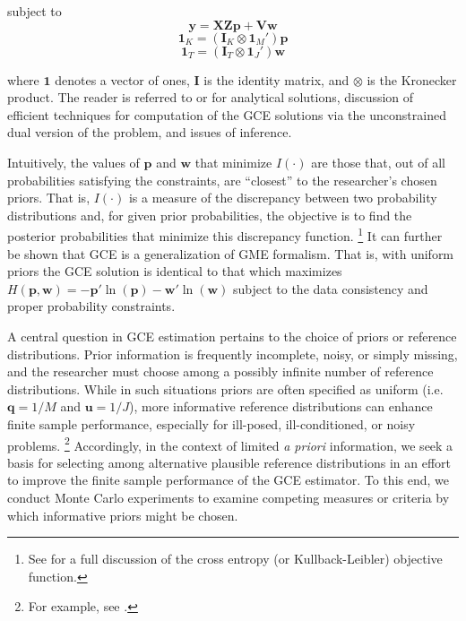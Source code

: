 \documentclass[english]{article}
\begin{document}
\noindent
subject to
\begin{equation}
\mathbf{y} = \mathbf{X Z p} 
+ \mathbf{V w}
\end{equation}
\begin{equation}
\mathbf{1}_K = (\mathbf{I}_K \otimes \mathbf{1}_M')\mathbf{p}
\end{equation}
\begin{equation}
\mathbf{1}_T = (\mathbf{I}_T \otimes \mathbf{1}_J')\mathbf{w}
\end{equation}

\noindent
where $\mathbf{1}$ denotes a vector of ones, $\mathbf{I}$ is the 
identity matrix, and $\otimes$ is the Kronecker product.
The reader is referred to \citet[Chap.\ 6]{golan1996} or 
\citet[Chap.\ 6]{golan2008} for analytical solutions, discussion of 
efficient techniques for computation of the GCE solutions via the 
unconstrained dual version of the problem, and issues of inference. 

Intuitively, the values of $\mathbf{p}$ and $\mathbf{w}$ that minimize
$I(\cdot)$ are those that, out of all probabilities satisfying the constraints, 
are ``closest'' to the researcher's chosen priors.
That is, $I(\cdot)$ is a measure of the discrepancy between two probability 
distributions and, for given prior probabilities, the objective is to find the 
posterior probabilities that minimize this discrepancy function.%
\footnote{See \citet[Chap.\ 6]{judge2011} for a full discussion of the 
cross entropy (or Kullback-Leibler) objective function.}
It can further be shown that GCE is a generalization of GME formalism.
That is, with uniform priors the GCE solution is identical to that which 
maximizes $H(\mathbf{p},\mathbf{w}) = - \mathbf{p}' \ln 
(\mathbf{p}) - \mathbf{w}' \ln (\mathbf{w})$ subject to the data
consistency and proper probability constraints. 

A central question in GCE estimation pertains to the choice of 
priors or reference distributions.
Prior information is frequently incomplete, noisy, or simply missing, and 
the researcher must choose among a possibly infinite number of 
reference distributions. 
While in such situations priors are often specified as uniform (i.e.\ 
$\mathbf{q}=1/M$ and $\mathbf{u}=1/J$), more informative 
reference distributions can enhance finite sample performance, especially 
for ill-posed, ill-conditioned, or noisy problems.%
\footnote{For example, see \citet{heckelei2003}.}
Accordingly, in the context of limited \textit{a priori} information, 
we seek a basis for selecting among alternative plausible reference 
distributions in an effort to improve the finite sample performance of 
the GCE estimator. 
To this end, we conduct Monte Carlo experiments to examine competing
measures or criteria by which informative priors might be chosen.
\end{document}
